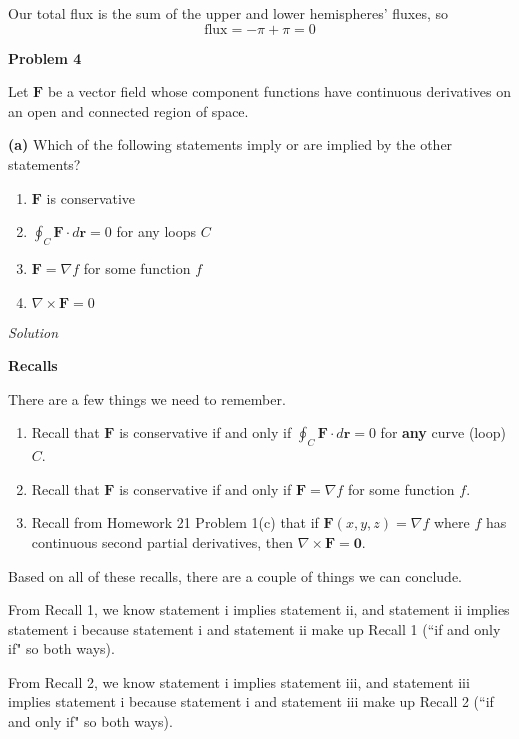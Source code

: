 \documentclass{article}
\renewcommand{\r}[0]{\mathbf{r}}
\newcommand{\F}[0]{\mathbf{F}}
\newcommand{\Solution}{\textit{Solution}}
\begin{document}
Our total flux is the sum of the upper and lower hemispheres' fluxes, so
\begin{equation*}
    \text{flux}=-\pi + \pi = \boxed{0}
\end{equation*}
\newpage
{}
{}\textbf{Problem 4}

Let $\F$ be a vector field whose component functions have continuous derivatives on an open and connected region of space.

{}\textbf{(a)} Which of the following statements imply or are implied by the other statements?

\renewcommand{\labelenumi}{\roman{enumiv}\roman{enumi}.}
\begin{multicols}{2}
\begin{enumerate}
      \item $\F$ is conservative
      \item $\displaystyle\oint_C \F\cdot d\r=0$ for any loops $C$
\columnbreak
\item $\F=\nabla f $ for some function $f$
\item $\nabla \times \F =0$
\end{enumerate}
\end{multicols}
\Solution

{} \textbf{Recalls}

There are a few things we need to remember.
\renewcommand{\labelenumi}{\arabic{enumi}.}
\begin{enumerate}
    \item Recall that $\F$ is conservative if and only if $\displaystyle\oint_C \F\cdot d\r=0$ for \textbf{any} curve (loop) $C$.
    \item Recall that $\F$ is conservative if and only if $\F=\nabla f$ for some function $f$.
\item Recall from Homework 21 Problem 1(c) that if $\F(x,y,z)=\nabla f$ where $f$ has continuous second partial derivatives, then $\nabla \times \F=\mathbf{0}$.
\end{enumerate}


Based on all of these recalls, there are a couple of things we can conclude.

From Recall 1, we know statement i implies statement ii, and statement ii implies statement i because statement i and statement ii make up Recall 1 (``if and only if" so both ways).

From Recall 2, we know statement i implies statement iii, and statement iii implies statement i because statement i and statement iii make up Recall 2 (``if and only if" so both ways).
\end{document}
